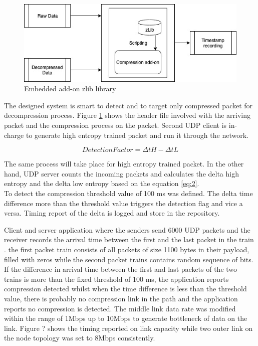 \documentclass[sigconf]{acmart}
\begin{document}
 \begin{figure}[h]
  \centering
  \includegraphics[width=\linewidth]{zlib}
  \caption{Embedded add-on zlib library }
  \label{zlib}
\end{figure} 

The designed system is smart to detect and to target only compressed packet for decompression process. Figure \ref{zlib} shows the header file involved with the arriving packet and the compression process on the packet. 
Second UDP client is in-charge to generate high entropy trained packet and run it through the network. 

\begin{equation}
 	DetectionFactor = \Delta tH - \Delta tL \label{eq:2}
\end{equation}


The same process will take place for high entropy trained packet. In the other hand, UDP server counts the incoming packets and calculates the delta high entropy and the delta low entropy based on the equation \ref{eq:2}.\\
To detect the compression threshold value of 100 ms was defined.  The delta time difference more than the threshold value triggers the detection flag and vice a versa. Timing report of the delta is logged and store in the repository.  
 
Client and server application where the senders send 6000 UDP packets and the receiver records the arrival time between the first and the last packet in the train . the first packet train consists of all packets of size 1100 bytes in their payload, filled with zeros while the second packet trains contains random sequence of bits. If the difference in arrival time between the first and last packets of the two trains is more than the fixed threshold of 100 ms, the application reports compression detected whilst when the time difference is less than the threshold value, there is probably no compression link in the path and the application reports no compression is detected. The middle link data rate was modified within the range of 1Mbps up to 10Mbps to generate bottleneck of data on the link. Figure ? shows the timing reported on link capacity while two outer link on the node topology was set to 8Mbps consistently. 
\end{document}
